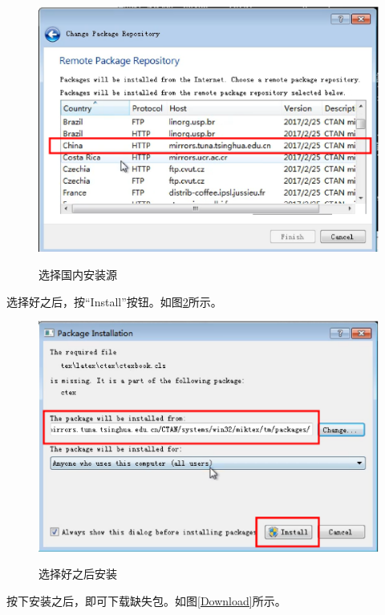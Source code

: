\begin{figure}[th]
	\centering
	\includegraphics[scale=0.5]{./Pictures/SelRep_0.eps}\\
	\caption{选择国内安装源}
	\label{SelRep_0}
\end{figure}

\newpage

选择好之后，按“Install”按钮。如图\ref{PkgSelect}所示。

\begin{figure}[th]
	\centering
	\includegraphics[scale=0.5]{./Pictures/PkgSelect.eps}\\
	\caption{选择好之后安装}
	\label{PkgSelect}
\end{figure}

按下安装之后，即可下载缺失包。如图\ref{Download}所示。

